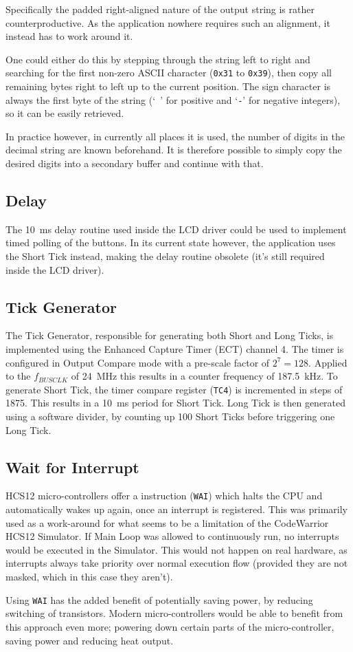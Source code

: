 Specifically the padded right-aligned nature of the output string is rather counterproductive. As the application nowhere requires such an alignment, it instead has to work around it.

One could either do this by stepping through the string left to right and searching for the first non-zero ASCII character (\texttt{0x31} to \texttt{0x39}), then copy all remaining bytes right to left up to the current position. The sign character is always the first byte of the string (`\texttt{~}' for positive and `\texttt{-}' for negative integers), so it can be easily retrieved.

In practice however, in currently all places it is used, the number of digits in the decimal string are known beforehand. It is therefore possible to simply copy the desired digits into a secondary buffer and continue with that.

\subsection{Delay}

The \SI{10}{\ms} delay routine used inside the LCD driver could be used to implement timed polling of the buttons. In its current state however, the application uses the Short Tick instead, making the delay routine obsolete (it's still required inside the LCD driver).

\subsection{Tick Generator}

The Tick Generator, responsible for generating both Short and Long Ticks, is implemented using the Enhanced Capture Timer (ECT) channel 4. The timer is configured in Output Compare mode with a pre-scale factor of \(2^{7} = 128\). Applied to the \(f_{BUSCLK}\) of \SI{24}{\mega\hertz} this results in a counter frequency of \SI{187.5}{\kilo\hertz}. To generate Short Tick, the timer compare register (\texttt{TC4}) is incremented in steps of \num{1875}. This results in a \SI{10}{\milli\second} period for Short Tick. Long Tick is then generated using a software divider, by counting up \num{100} Short Ticks before triggering one Long Tick.

\subsection{Wait for Interrupt}

HCS12 micro-controllers offer a instruction (\texttt{WAI}) which halts the CPU and automatically wakes up again, once an interrupt is registered. This was primarily used as a work-around for what seems to be a limitation of the CodeWarrior HCS12 Simulator. If Main Loop was allowed to continuously run, no interrupts would be executed in the Simulator. This would not happen on real hardware, as interrupts always take priority over normal execution flow (provided they are not masked, which in this case they aren't).

Using \texttt{WAI} has the added benefit of potentially saving power, by reducing switching of transistors. Modern micro-controllers would be able to benefit from this approach even more; powering down certain parts of the micro-controller, saving power and reducing heat output.
